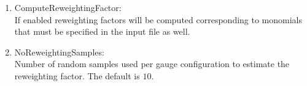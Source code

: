 \begin{enumerate}
\item {\ttfamily ComputeReweightingFactor}:\\
  If enabled reweighting factors will be computed corresponding to
  monomials that must be specified in the input file as well.

\item {\ttfamily NoReweightingSamples}:\\
  Number of random samples used per gauge configuration to estimate
  the reweighting factor. The default is $10$.

\end{enumerate}


